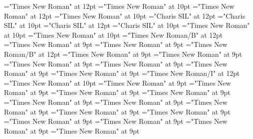 \documentclass[gps1,twoside]{article}
\begin{document}
\pagestyle{plain}
\sloppy
\setlength{\parfillskip}{0pt plus 1fil}
\font\diven="Times New Roman" at 12pt
\font\spanen="Times New Roman" at 10pt
\font\divtpi="Times New Roman" at 12pt
\font\spantpi="Times New Roman" at 10pt
\font\divbzh="Charis SIL" at 12pt
\font\spanbzh="Charis SIL" at 10pt
\font\divbzhfonipa="Charis SIL" at 12pt
\font\spanbzhfonipa="Charis SIL" at 10pt
\font\spanfr="Times New Roman" at 10pt
\font\spanes="Times New Roman" at 10pt
\font\spanbzhmainheadwordentry="Times New Roman/B" at 12pt
\font\spanspanmainheadwordentrybefore="Times New Roman" at 9pt
\font\spanmainheadwordentrylastchildafter="Times New Roman" at 9pt
\font\spanmainheadwordentry="Times New Roman/B" at 12pt
\font\pronunciationpronunciationpronunciationsentrybefore="Times New Roman" at 9pt
\font\pronunciationsentryafter="Times New Roman" at 9pt
\font\spanspanformpronunciationpronunciationsentrybefore="Times New Roman" at 9pt
\font\spanformpronunciationpronunciationsentryfirstchildbefore="Times New Roman" at 9pt
\font\spanformpronunciationpronunciationsentrylastchildafter="Times New Roman" at 9pt
\font\locationpronunciationpronunciationsentryafter="Times New Roman" at 9pt
\font\locationpronunciationpronunciationsentry="Times New Roman/I" at 12pt
\font\spanwritingsystemprefixspanabbreviationlocationpronunciationpronunciationsentry="Times New Roman" at 10pt
\font\spanwritingsystemprefixspanabbreviationlocationpronunciationpronunciationsentryafter="Times New Roman" at 9pt
\font\spanspanabbreviationlocationpronunciationpronunciationsentrybefore="Times New Roman" at 9pt
\font\spanabbreviationlocationpronunciationpronunciationsentrylastchildafter="Times New Roman" at 9pt
\font\spanspannamelocationpronunciationpronunciationsentrybefore="Times New Roman" at 9pt
\font\spannamelocationpronunciationpronunciationsentrylastchildafter="Times New Roman" at 9pt
\font\spanspanaliaslocationpronunciationpronunciationsentrybefore="Times New Roman" at 9pt
\font\spanaliaslocationpronunciationpronunciationsentrylastchildafter="Times New Roman" at 9pt
\font\spanspanvariantformentrybackrefsentrybefore="Times New Roman" at 9pt
\font\variantformentrybackrefsentrybefore="Times New Roman" at 9pt
\font\variantformentrybackrefsentryafter="Times New Roman" at 9pt
\font\variantentrytypevariantentrytypevariantentrytypesvariantformentrybackrefvariantformentrybackrefsentrybefore="Times New Roman" at 9pt
\font\variantentrytypesvariantformentrybackrefvariantformentrybackrefsentryafter="Times New Roman" at 9pt
\font\spanspanreverseabbrvariantentrytypevariantentrytypesvariantformentrybackrefvariantformentrybackrefsentrybefore="Times New Roman" at 9pt
\end{document}

